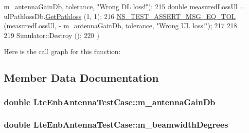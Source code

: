 \begin{DoxyCode}
      \hyperlink{classLteEnbAntennaTestCase_a0fa6f3b1360dea56b4931cda06709952}{m\_antennaGainDb}, tolerance, \textcolor{stringliteral}{"Wrong DL loss!"});
215   \textcolor{keywordtype}{double} measuredLossUl = ulPathlossDb.\hyperlink{classns3_1_1LteGlobalPathlossDatabase_a06da4a86a140c90b2dad5f5fad9868f3}{GetPathloss} (1, 1);
216   \hyperlink{group__testing_ga9e7861b56b4e70db3b56044cb7a28e41}{NS\_TEST\_ASSERT\_MSG\_EQ\_TOL} (measuredLossUl, -
      \hyperlink{classLteEnbAntennaTestCase_a0fa6f3b1360dea56b4931cda06709952}{m\_antennaGainDb}, tolerance, \textcolor{stringliteral}{"Wrong UL loss!"});
217 
218   
219   Simulator::Destroy ();
220 \}
\end{DoxyCode}


Here is the call graph for this function\+:




\subsection{Member Data Documentation}
\subsubsection[{\texorpdfstring{m\+\_\+antenna\+Gain\+Db}{m_antennaGainDb}}]{\setlength{\rightskip}{0pt plus 5cm}double Lte\+Enb\+Antenna\+Test\+Case\+::m\+\_\+antenna\+Gain\+Db\hspace{0.3cm}{\ttfamily [private]}}\hypertarget{classLteEnbAntennaTestCase_a0fa6f3b1360dea56b4931cda06709952}{}\label{classLteEnbAntennaTestCase_a0fa6f3b1360dea56b4931cda06709952}
\subsubsection[{\texorpdfstring{m\+\_\+beamwidth\+Degrees}{m_beamwidthDegrees}}]{\setlength{\rightskip}{0pt plus 5cm}double Lte\+Enb\+Antenna\+Test\+Case\+::m\+\_\+beamwidth\+Degrees\hspace{0.3cm}{\ttfamily [private]}}\hypertarget{classLteEnbAntennaTestCase_a7a246ef6af585fb0d99177085d5caeba}{}\label{classLteEnbAntennaTestCase_a7a246ef6af585fb0d99177085d5caeba}
